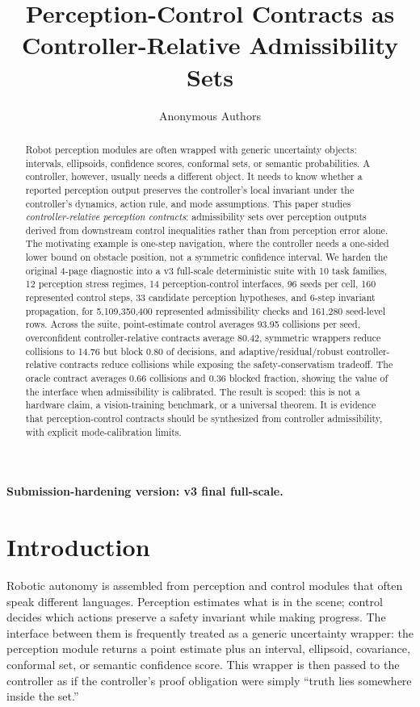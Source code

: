 \documentclass{article}
\title{Perception-Control Contracts as Controller-Relative Admissibility Sets}
\author{Anonymous Authors}
\newcommand{\fullscale}{5,109,350,400}
\newcommand{\seedrows}{161,280}
\begin{document}
\maketitle

\noindent\textbf{Submission-hardening version: v3 final full-scale.}

\begin{abstract}
Robot perception modules are often wrapped with generic uncertainty objects: intervals, ellipsoids, confidence scores, conformal sets, or semantic probabilities. A controller, however, usually needs a different object. It needs to know whether a reported perception output preserves the controller's local invariant under the controller's dynamics, action rule, and mode assumptions. This paper studies \emph{controller-relative perception contracts}: admissibility sets over perception outputs derived from downstream control inequalities rather than from perception error alone. The motivating example is one-step navigation, where the controller needs a one-sided lower bound on obstacle position, not a symmetric confidence interval. We harden the original 4-page diagnostic into a v3 full-scale deterministic suite with 10 task families, 12 perception stress regimes, 14 perception-control interfaces, 96 seeds per cell, 160 represented control steps, 33 candidate perception hypotheses, and 6-step invariant propagation, for \fullscale{} represented admissibility checks and \seedrows{} seed-level rows. Across the suite, point-estimate control averages 93.95 collisions per seed, overconfident controller-relative contracts average 80.42, symmetric wrappers reduce collisions to 14.76 but block 0.80 of decisions, and adaptive/residual/robust controller-relative contracts reduce collisions while exposing the safety-conservatism tradeoff. The oracle contract averages 0.66 collisions and 0.36 blocked fraction, showing the value of the interface when admissibility is calibrated. The result is scoped: this is not a hardware claim, a vision-training benchmark, or a universal theorem. It is evidence that perception-control contracts should be synthesized from controller admissibility, with explicit mode-calibration limits.
\end{abstract}

\section{Introduction}

Robotic autonomy is assembled from perception and control modules that often speak different languages. Perception estimates what is in the scene; control decides which actions preserve a safety invariant while making progress. The interface between them is frequently treated as a generic uncertainty wrapper: the perception module returns a point estimate plus an interval, ellipsoid, covariance, conformal set, or semantic confidence score. This wrapper is then passed to the controller as if the controller's proof obligation were simply ``truth lies somewhere inside the set.''
\end{document}
